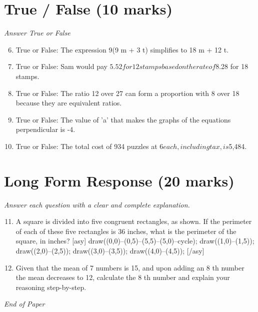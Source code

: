 \documentclass[12pt]{article}
\begin{document}
\section*{True / False (10 marks)}
\textit{Answer True or False}
\begin{enumerate}[label=\arabic*.]
\setcounter{enumi}{5}
\item True or False: The expression 9(9 m + 3 t) simplifies to 18 m + 12 t.
\item True or False: Sam would pay $5.52 for 12 stamps based on the rate of $8.28 for 18 stamps.
\item True or False: The ratio 12 over 27 can form a proportion with 8 over 18 because they are equivalent ratios.
\item True or False: The value of 'a' that makes the graphs of the equations perpendicular is -4.
\item True or False: The total cost of 934 puzzles at $6 each, including tax, is $5,484.
\end{enumerate}

\section*{Long Form Response (20 marks)}
\textit{Answer each question with a clear and complete explanation.}
\begin{enumerate}[label=\arabic*.]
\setcounter{enumi}{10}
\item A square is divided into five congruent rectangles, as shown. If the perimeter of each of these five rectangles is 36 inches, what is the perimeter of the square, in inches? [asy] draw((0,0)--(0,5)--(5,5)--(5,0)--cycle); draw((1,0)--(1,5)); draw((2,0)--(2,5)); draw((3,0)--(3,5)); draw((4,0)--(4,5)); [/asy]
\item Given that the mean of 7 numbers is 15, and upon adding an 8 th number the mean decreases to 12, calculate the 8 th number and explain your reasoning step-by-step.
\end{enumerate}

\vfill
\noindent\textit{End of Paper}
\end{document}
